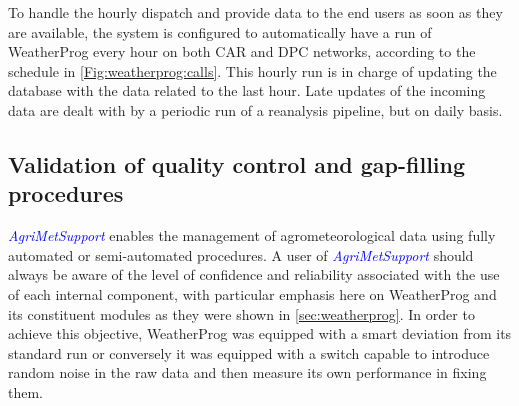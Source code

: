 \documentclass[authoryear,preprint,review,12pt]{elsarticle}
\newcommand{\update}[1]{\emph{\textcolor{blue}{#1}}}
\newcommand{\gci}{\update{AgriMetSupport}\xspace}
\begin{document}
 
To handle the hourly dispatch and provide data to the end users as soon as they are available, the system is configured to automatically have a run of WeatherProg every hour on both CAR and DPC networks, according to the schedule in \cref{Fig:weatherprog:calls}.
This hourly run is in charge of updating the database with the data related to the last hour.
Late updates of the incoming data are dealt with by a periodic run of a reanalysis pipeline, but on daily basis.

\subsection{Validation of quality control and gap-filling procedures} \label{sec:QcheckValidation}
\gci enables the management of agrometeorological data using fully automated or semi-automated procedures. %
A user of \gci should always be aware of the level of confidence and reliability associated with the use of each internal component, with particular emphasis here on WeatherProg and its constituent modules as they were shown in \cref{sec:weatherprog}. 
In order to achieve this objective, WeatherProg was equipped with a smart deviation from its standard run or conversely it was equipped with a switch capable to introduce random noise in the raw data and then measure its own performance in fixing them. %
\end{document}

